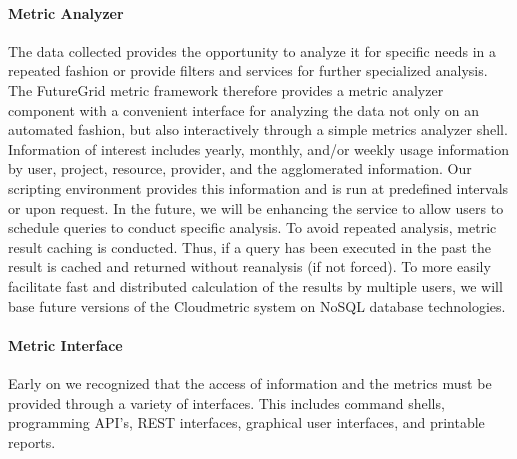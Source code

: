 \documentclass{tex/sig-alternate-2013}
\begin{document}
\paragraph{Metric Analyzer}

The data collected provides the opportunity to analyze it for specific needs in a repeated fashion or provide filters and services for further specialized analysis. The FutureGrid metric framework therefore provides a metric analyzer component with a convenient interface for analyzing the data not only on an automated fashion, but also interactively through a simple metrics analyzer shell. Information of interest includes yearly, monthly, and/or weekly usage information by user, project, resource, provider, and the agglomerated information. Our scripting environment provides this information and is run at predefined intervals or upon request. In the future, we will be enhancing the service to allow users to schedule queries to conduct specific analysis. To avoid repeated analysis, metric result caching is conducted. Thus, if a query has been executed in the past the result is cached and returned without reanalysis (if not forced). To more easily facilitate fast and distributed calculation of the results by multiple users, we will base future versions of the Cloudmetric system on NoSQL database technologies.

\paragraph{Metric Interface}

Early on we recognized that the access of information and the metrics must be provided through a variety of interfaces. This includes command shells, programming API's, REST interfaces, graphical user interfaces, and printable reports.
\end{document}
